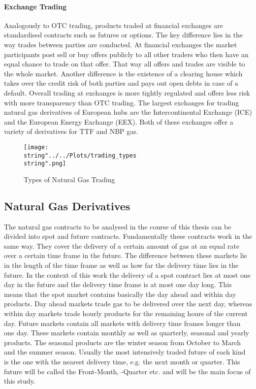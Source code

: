 \paragraph{Exchange Trading}
Analogously to OTC trading, products traded at financial exchanges are standardised contracts such as futures or options. The key difference lies in the way trades between parties are conducted. At financial exchanges the market participants post sell or buy offers publicly to all other traders who then have an equal chance to trade on that offer. That way all offers and trades are visible to the whole market. Another difference is the existence of a clearing house which takes over the credit risk of both parties and pays out open debts in case of a default. Overall trading at exchanges is more tightly regulated and offers less risk with more transparency than OTC trading. The largest exchanges for trading natural gas derivatives of European hubs are the Intercontinental Exchange (ICE) and the European Energy Exchange (EEX). Both of these exchanges offer a variety of derivatives for TTF and NBP gas.

\begin{figure}[H]
  \centering
\texttt{[image: \\string"../../Plots/trading\_types\\string".png]}
  \caption{Types of Natural Gas Trading}\label{fig:trading_types}
\end{figure}

\subsection{Natural Gas Derivatives}
The natural gas contracts to be analysed in the course of this thesis can be divided into spot and future contracts. Fundamentally these contracts work in the same way. They cover the delivery of a certain amount of gas at an equal rate over a certain time frame in the future. The difference between these markets lie in the length of the time frame as well as how far the delivery time lies in the future. In the context of this work the delivery of a spot contract lies at most one day in the future and the delivery time frame is at most one day long. This means that the spot market contains basically the day ahead and within day products. Day ahead markets trade gas to be delivered over the next day, whereas within day markets trade hourly products for the remaining hours of the current day. Future markets contain all markets with delivery time frames longer than one day. These markets contain monthly as well as quarterly, seasonal and yearly products. The seasonal products are the winter season from October to March and the summer season. Usually the most intensively traded future of each kind is the one with the nearest delivery time, e.g. the next month or quarter. This future will be called the Front-Month, -Quarter etc. and will be the main focus of this study. 

